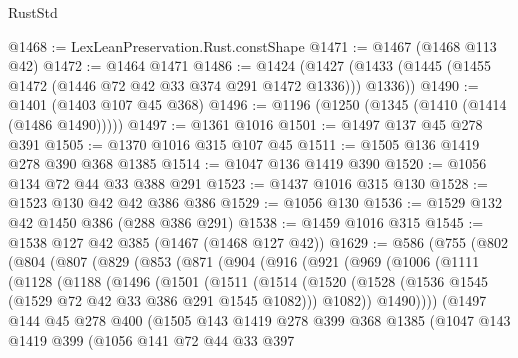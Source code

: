 \begin{lexlean}{RustStd}
\begin{coremodule}
{\begin{coremodule}
{{{{{{{{{@1468 := LexLeanPreservation.Rust.constShape
@1471 := @1467 (@1468 @113 @42)
@1472 := @1464 @1471
@1486 := @1424 (@1427 (@1433 (@1445 (@1455 @1472 (@1446 @72 @42 @33 @374 @291 @1472 @1336))) @1336))
@1490 := @1401 (@1403 @107 @45 @368)
@1496 := @1196 (@1250 (@1345 (@1410 (@1414 (@1486 @1490)))))
@1497 := @1361 @1016
@1501 := @1497 @137 @45 @278 @391
@1505 := @1370 @1016 @315 @107 @45
@1511 := @1505 @136 @1419 @278 @390 @368 @1385
@1514 := @1047 @136 @1419 @390
@1520 := @1056 @134 @72 @44 @33 @388 @291
@1523 := @1437 @1016 @315 @130
@1528 := @1523 @130 @42 @42 @386 @386
@1529 := @1056 @130
@1536 := @1529 @132 @42 @1450 @386 (@288 @386 @291)
@1538 := @1459 @1016 @315
@1545 := @1538 @127 @42 @385 (@1467 (@1468 @127 @42))
@1629 := @586
    (@755
      (@802
        (@804
          (@807
            (@829
              (@853
                (@871
                  (@904
                    (@916
                      (@921
                        (@969
                          (@1006
                            (@1111
                              (@1128
                                (@1188
                                  (@1496
                                    (@1501
                                      (@1511
                                        (@1514
                                          (@1520
                                            (@1528
                                              (@1536
                                                @1545
                                                (@1529 @72 @42 @33 @386 @291 @1545 @1082)))
                                            @1082))
                                        @1490))))
                                (@1497
                                  @144
                                  @45
                                  @278
                                  @400
                                  (@1505
                                    @143
                                    @1419
                                    @278
                                    @399
                                    @368
                                    @1385
                                    (@1047
                                      @143
                                      @1419
                                      @399
                                      (@1056
                                        @141
                                        @72
                                        @44
                                        @33
                                        @397
}}}}}}}}}
\end{coremodule}}
\end{coremodule}
\end{lexlean}
